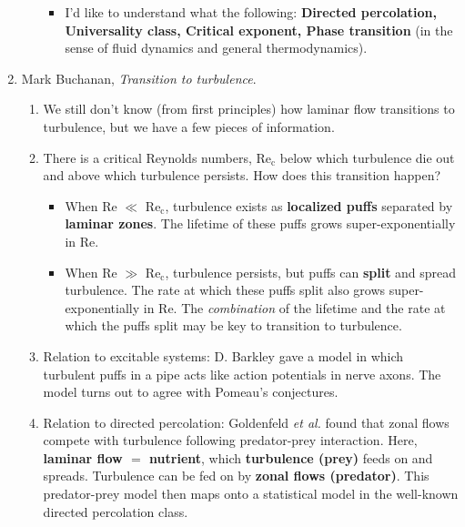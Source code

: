 \documentclass[11pt]{article}
\begin{document}
\begin{enumerate}
\begin{enumerate}
\begin{itemize}
		\item I'd like to understand what the following: \textbf{Directed percolation, Universality class, Critical exponent, Phase transition} (in the sense of fluid dynamics and general thermodynamics).
	\end{itemize}
	 
	\end{enumerate}
	
	
	\item Mark Buchanan, \textit{Transition to turbulence}.
	\begin{enumerate}
		\item We still don't know (from first principles) how laminar flow transitions to turbulence, but we have a few pieces of information.
		
		\item There is a critical Reynolds numbers, Re$_\text{c}$ below which turbulence die out and above which turbulence persists. How does this transition happen? 
		
		\begin{itemize}
			\item When Re $\ll$ Re$_\text{c}$, turbulence exists as \textbf{localized puffs} separated by \textbf{laminar zones}. The lifetime of these puffs grows super-exponentially in Re. 
			
			\item When Re $\gg$ Re$_\text{c}$, turbulence persists, but puffs can \textbf{split} and spread turbulence. The rate at which these puffs split also grows super-exponentially in Re. The \textit{combination} of the lifetime and the rate at which the puffs split may be key to transition to turbulence. 
		\end{itemize}
	
		\item Relation to excitable systems: D. Barkley gave a model in which turbulent puffs in a pipe acts like action potentials in nerve axons. The model turns out to agree with Pomeau's conjectures. 
		
		\item Relation to directed percolation: Goldenfeld \textit{et al.} found that  zonal flows compete with
		turbulence following predator-prey interaction. Here, \textbf{laminar flow $=$ nutrient}, which
		\textbf{turbulence (prey)} feeds on and spreads. Turbulence can be fed on by \textbf{zonal flows (predator)}. This predator-prey model then maps onto a statistical model in the well-known directed percolation class.
		

\end{enumerate}
\end{enumerate}
\end{document}
